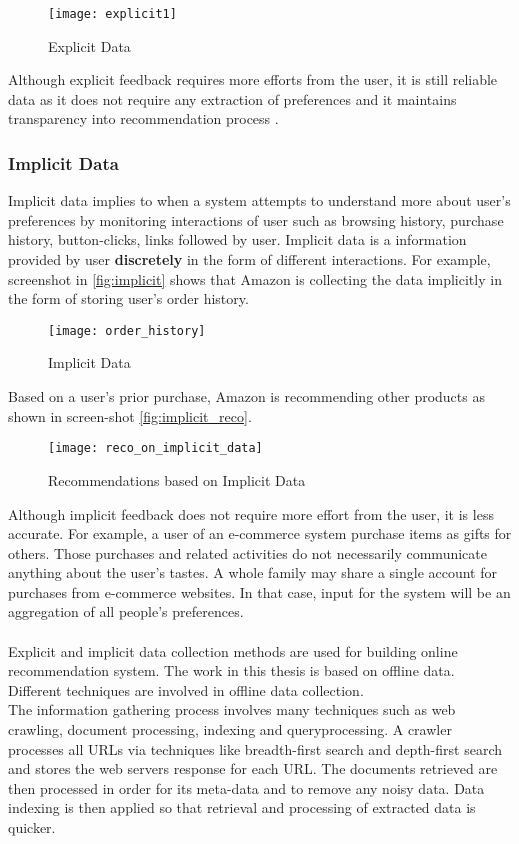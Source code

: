\begin{figure}[H]
	\centering
	\texttt{[image: explicit1]}
	\caption{Explicit Data \cite{36}}
	\label{fig:explicit}
\end{figure}

\noindent Although explicit feedback requires more efforts from the user, it is still reliable data as it does not require any extraction of preferences and it maintains transparency into recommendation process \cite{35}. 
 
\subsubsection{Implicit Data}

Implicit data implies to when a system attempts to understand more about user's preferences by monitoring interactions of user such as browsing history, purchase history, button-clicks, links followed by user. Implicit data is a information provided by user \textbf{discretely} in the form of different interactions. For example, screenshot in \autoref{fig:implicit} shows that Amazon is collecting the data implicitly in the form of storing user's order history. 
\begin{figure}[H]
	\centering
	\texttt{[image: order\_history]}
	\caption{Implicit Data}
	\label{fig:implicit}
\end{figure}

\noindent Based on a user's prior purchase, Amazon is recommending other products as shown in screen-shot \autoref{fig:implicit_reco}.

\begin{figure}[H]
	\centering
	\texttt{[image: reco\_on\_implicit\_data]}
	\caption{Recommendations based on Implicit Data}
	\label{fig:implicit_reco}
\end{figure}


\noindent Although implicit feedback does not require more effort from the user, it is less accurate. For example, a user of an e-commerce system purchase items as gifts for others. Those purchases and related activities do not necessarily communicate anything about the user’s tastes. A whole family may share a single account for purchases from e-commerce websites. In that case, input for the system will be an aggregation of all people's preferences.
\\
\\
Explicit and implicit data collection methods are used for building online recommendation system. The work in this thesis is based on offline data. Different techniques are involved in offline data collection. \\
The information gathering process involves many techniques such as web crawling, document processing, indexing and queryprocessing. A crawler processes all URLs via techniques like breadth-first search and depth-first search and stores the web servers response for each URL. The documents retrieved are then processed in order for its meta-data and to remove any noisy data. Data indexing is then applied so that retrieval and processing of extracted data is quicker. 


